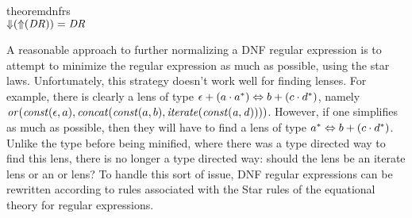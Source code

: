 \begin{restatable}{theorem}{dnfrs}\leavevmode\\
\label{thm:soundness-dnf-lenses}
$\mathit{\Downarrow}(\mathit{\Uparrow}(\mathit{DR})) = \mathit{DR}$
\end{restatable}

A reasonable approach to further normalizing a DNF regular expression is to attempt to minimize the
regular expression as much as possible, using the star laws.
Unfortunately, this strategy doesn't work
well for finding lenses.  For example, there is clearly a lens of type
$\epsilon+(a\cdot a^*) \Leftrightarrow b+(c\cdot d^*)$,
namely $\mathit{or}(\mathit{const}(\epsilon,a),\mathit{concat}(\mathit{const}(a,b),\mathit{iterate(\mathit{const}(a,d))}))$.
However, if one simplifies as much as possible, then they will have to find a lens
of type $a^* \Leftrightarrow b+(c\cdot d^*)$.
Unlike the type before being minified, where there was a type directed way to find
this lens, there is no longer a type directed way: should the lens be an iterate lens
or an or lens?
To handle this sort of issue, DNF regular expressions can be rewritten according
to rules associated with the Star rules of the equational theory for regular
expressions.

